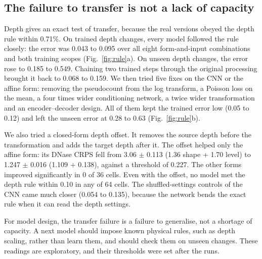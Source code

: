 \documentclass[pdflatex,sn-mathphys-num]{sn-jnl}
\newcommand{\lit}[1]{#1}
\newcommand{\fixNeverHi}{0.63}
\newcommand{\fixNeverLo}{0.28}
\newcommand{\fixTrHi}{0.12}
\newcommand{\fixTrLo}{0.05}
\newcommand{\lawData}{0.71}
\newcommand{\offA}{1.247}
\newcommand{\offAOS}{1.109}
\newcommand{\offASE}{0.138}
\newcommand{\offAw}{0.016}
\newcommand{\offBDclear}{0}
\newcommand{\offBDn}{36}
\newcommand{\offBar}{0.227}
\newcommand{\offLawN}{64}
\newcommand{\offTwinHi}{0.135}
\newcommand{\offTwinLo}{0.054}
\newcommand{\oldA}{3.06}
\newcommand{\oldAOS}{1.36}
\newcommand{\oldASE}{1.70}
\newcommand{\oldAw}{0.113}
\newcommand{\ruleNeverHi}{0.549}
\newcommand{\ruleNeverLo}{0.185}
\newcommand{\ruleTrHi}{0.095}
\newcommand{\ruleTrLo}{0.043}
\newcommand{\ruleViaHi}{0.159}
\newcommand{\ruleViaLo}{0.068}
\begin{document}
\subsection{The failure to transfer is not a lack of capacity}\label{sec:r5}

Depth gives an exact test of transfer, because the real versions obeyed the depth rule within
\lawData\%. On trained depth changes, every model followed the rule closely: the error was
\ruleTrLo{} to \ruleTrHi{} over all eight form-and-input combinations and both training scopes
(Fig.~\ref{fig:rule}a). On unseen depth changes, the error rose to \ruleNeverLo{} to
\ruleNeverHi{}. Chaining two trained steps through the original processing brought it back to
\ruleViaLo{} to \ruleViaHi{}. We then tried five fixes on the CNN or the affine form: removing
the pseudocount from the log transform, a Poisson loss on the mean, a four times wider
conditioning network, a twice wider transformation and an encoder--decoder design. All of them
kept the trained error low (\fixTrLo{} to \fixTrHi{}) and left the unseen error at \fixNeverLo{}
to \fixNeverHi{} (Fig.~\ref{fig:rule}b).

We also tried a closed-form depth offset. It removes the source depth before the
transformation and adds the target depth after it. The offset helped only the affine form: its
DNase CRPS fell from \oldA{} $\pm$ \oldAw{} (\oldAOS{} shape + \oldASE{} level) to \offA{}
$\pm$ \offAw{} (\offAOS{} + \offASE{}), against a threshold of \offBar{}. The other forms improved
significantly in \offBDclear{} of \offBDn{} cells. Even with the offset, no model met the depth
rule within \lit{0.10} in any of \offLawN{} cells. The shuffled-settings controls of the CNN came
much closer (\offTwinLo{} to \offTwinHi{}), because the network bends the exact rule when it can
read the depth settings.

For model design, the transfer failure is a failure to generalise, not a shortage of capacity.
A next model should impose known physical rules, such as depth scaling, rather than learn them,
and should check them on unseen changes. These readings are exploratory, and their thresholds
were set after the runs.
\end{document}
